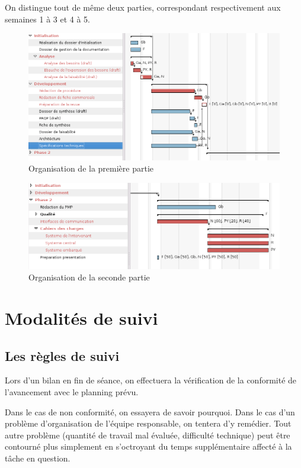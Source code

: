 \documentclass[a4paper, 11pt, draft]{report}
\begin{document}
    On distingue tout de même deux parties, correspondant respectivement aux semaines 1 à 3 et 4 à 5.

	\begin{figure}
	\begin{center}
	\includegraphics[width=\textwidth]{gantt1.png}
    \caption{Organisation de la première partie}
	\end{center}
	\end{figure}
	
    \begin{figure}
	\begin{center}
	\includegraphics[width=\textwidth]{gantt2.png}
    \caption{Organisation de la seconde partie}
	\end{center}
	\end{figure}

\section{Modalités de suivi}
    \subsection{Les règles de suivi}
    Lors d'un bilan en fin de séance, on effectuera la vérification de la conformité de l'avancement avec le planning prévu.

    Dans le cas de non conformité, on essayera de savoir pourquoi. Dans le cas d'un problème d'organisation de l'équipe responsable, on tentera d'y remédier. Tout autre problème (quantité de travail mal évaluée, difficulté technique) peut être contourné plus simplement en s'octroyant du temps supplémentaire affecté à la tâche en question.
\end{document}
